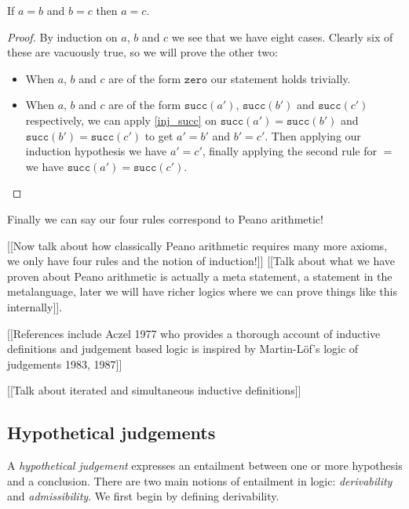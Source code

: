 \begin{lemma}[Transitivity of $=$]
    If $a = b$ and $b = c$ then $a = c$.
\end{lemma}

\begin{proof}
    By induction on $a$, $b$ and $c$ we see that we have eight cases. Clearly six of these are vacuously true, so we will prove the other two:
    \begin{itemize}
        \item When $a$, $b$ and $c$ are of the form $\texttt{zero}$ our statement holds trivially.
        \item When $a$, $b$ and $c$ are of the form $\texttt{succ}(a')$, $\texttt{succ}(b')$ and $\texttt{succ}(c')$ respectively, we can apply \ref{inj_succ} on $\texttt{succ}(a') =\texttt{succ}(b')$ and $\texttt{succ}(b') = \texttt{succ}(c')$ to get $a' = b'$ and $b' = c'$. Then applying our induction hypothesis we have $a' = c'$, finally applying the second rule for $=$ we have $\texttt{succ}(a') =\texttt{succ}(c')$.
    \end{itemize}
\end{proof}

Finally we can say our four rules correspond to Peano arithmetic!

[[Now talk about how classically Peano arithmetic requires many more axioms, we only have four rules and the notion of induction!]]
[[Talk about what we have proven about Peano arithmetic is actually a meta statement, a statement in the metalanguage, later we will have richer logics where we can prove things like this internally]].

[[References include Aczel 1977 who provides a thorough account of inductive definitions and judgement based logic is inspired by Martin-L\"of's logic of judgements 1983, 1987]]

[[Talk about iterated and simultaneous inductive definitions]]

\subsection{Hypothetical judgements}

A \emph{hypothetical judgement} expresses an entailment between one or more hypothesis and a conclusion. There are two main notions of entailment in logic: \emph{derivability} and \emph{admissibility}. We first begin by defining derivability.

